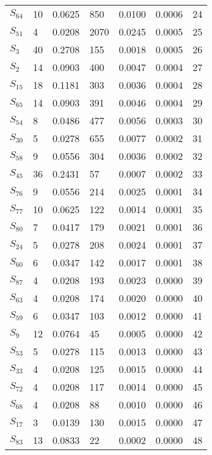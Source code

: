 \begin{xltabular}{\textwidth}{XPPPPPP}
  $S_{64}$ & 10 & 0.0625 & 850 & 0.0100 & 0.0006 & 24 \\ 
  $S_{51}$ & 4 & 0.0208 & 2070 & 0.0245 & 0.0005 & 25 \\ 
  $S_{3}$ & 40 & 0.2708 & 155 & 0.0018 & 0.0005 & 26 \\ 
  $S_{2}$ & 14 & 0.0903 & 400 & 0.0047 & 0.0004 & 27 \\ 
  $S_{15}$ & 18 & 0.1181 & 303 & 0.0036 & 0.0004 & 28 \\ 
  $S_{65}$ & 14 & 0.0903 & 391 & 0.0046 & 0.0004 & 29 \\ 
  $S_{54}$ & 8 & 0.0486 & 477 & 0.0056 & 0.0003 & 30 \\ 
  $S_{30}$ & 5 & 0.0278 & 655 & 0.0077 & 0.0002 & 31 \\ 
  $S_{58}$ & 9 & 0.0556 & 304 & 0.0036 & 0.0002 & 32 \\ 
  $S_{45}$ & 36 & 0.2431 & 57 & 0.0007 & 0.0002 & 33 \\ 
  $S_{76}$ & 9 & 0.0556 & 214 & 0.0025 & 0.0001 & 34 \\ 
  $S_{77}$ & 10 & 0.0625 & 122 & 0.0014 & 0.0001 & 35 \\ 
  $S_{80}$ & 7 & 0.0417 & 179 & 0.0021 & 0.0001 & 36 \\ 
  $S_{24}$ & 5 & 0.0278 & 208 & 0.0024 & 0.0001 & 37 \\ 
  $S_{60}$ & 6 & 0.0347 & 142 & 0.0017 & 0.0001 & 38 \\ 
  $S_{87}$ & 4 & 0.0208 & 193 & 0.0023 & 0.0000 & 39 \\ 
  $S_{63}$ & 4 & 0.0208 & 174 & 0.0020 & 0.0000 & 40 \\ 
  $S_{59}$ & 6 & 0.0347 & 103 & 0.0012 & 0.0000 & 41 \\ 
  $S_{9}$ & 12 & 0.0764 & 45 & 0.0005 & 0.0000 & 42 \\ 
  $S_{53}$ & 5 & 0.0278 & 115 & 0.0013 & 0.0000 & 43 \\ 
  $S_{33}$ & 4 & 0.0208 & 125 & 0.0015 & 0.0000 & 44 \\ 
  $S_{72}$ & 4 & 0.0208 & 117 & 0.0014 & 0.0000 & 45 \\ 
  $S_{68}$ & 4 & 0.0208 & 88 & 0.0010 & 0.0000 & 46 \\ 
  $S_{17}$ & 3 & 0.0139 & 130 & 0.0015 & 0.0000 & 47 \\ 
  $S_{83}$ & 13 & 0.0833 & 22 & 0.0002 & 0.0000 & 48 \\ 

\end{xltabular}
